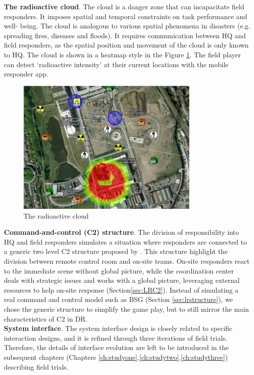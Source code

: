 \textbf{The radioactive cloud}. The cloud is a danger zone that can incapacitate field responders. It imposes spatial and temporal constraints on task performance and well- being. The cloud is analogous to various spatial phenomena in disasters (e.g. spreading fires, diseases and floods). It requires communication between HQ and field responders, as the spatial position and movement of the cloud is only known to HQ. The cloud is shown in a heatmap style in the Figure \ref{fig:cloud}. The field player can detect `radioactive intensity' at their current locations with the mobile responder app.\\

\begin{figure}[h]
  \centering
  \includegraphics[width=0.8\textwidth]{img/approach/radioactiveCloud}
  \caption{The radioactive cloud}
  \label{fig:cloud}
\end{figure}

\textbf{Command-and-control (C2) structure}. The division of responsibility into HQ and field responders simulates a situation where  responders are connected to a generic two level \ac{C2} structure proposed by \cite{Chen2005}. This structure highlight the division between remote control room and on-site teams.  On-site responders react to the immediate scene without global picture, while the coordination center deals with strategic issues and works with a global picture, leveraging external resources to help on-site response (Section\ref{sec:LRC2}). Instead of simulating a real command and control model such as \ac{BSG} (Section \ref{sec:lrstructure}), we chose the generic structure to simplify the game play, but to still mirror the main characteristics of \ac{C2} in \ac{DR}. \\

\textbf{System interface}. The system interface design is closely related to specific interaction designs, and it is refined through three iterations of field trials. Therefore, the details of interface evolution are left to be introduced in the subsequent chapters (Chapters \ref{ch:studyone},\ref{ch:studytwo},\ref{ch:studythree}) describing field trials. \\



